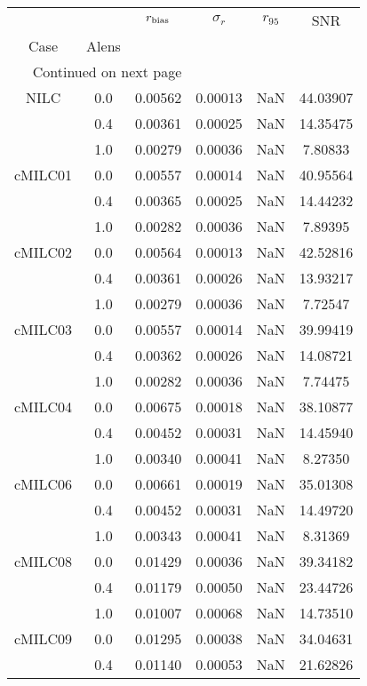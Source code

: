 \begin{longtable}{cccccc}
\toprule
     &     &  $r_{\rm bias}$  &  $\sigma_r$ &  $r_{95}$ &      SNR \\
Case & Alens &                  &             &           &          \\
\midrule
\endhead
\midrule
\multicolumn{3}{r}{{Continued on next page}} \\
\midrule
\endfoot

\bottomrule
\endlastfoot
NILC & 0.0 & 0.00562 & 0.00013 & NaN & 44.03907 \\
     & 0.4 & 0.00361 & 0.00025 & NaN & 14.35475 \\
     & 1.0 & 0.00279 & 0.00036 & NaN & 7.80833 \\
cMILC01 & 0.0 & 0.00557 & 0.00014 & NaN & 40.95564 \\
     & 0.4 & 0.00365 & 0.00025 & NaN & 14.44232 \\
     & 1.0 & 0.00282 & 0.00036 & NaN & 7.89395 \\
cMILC02 & 0.0 & 0.00564 & 0.00013 & NaN & 42.52816 \\
     & 0.4 & 0.00361 & 0.00026 & NaN & 13.93217 \\
     & 1.0 & 0.00279 & 0.00036 & NaN & 7.72547 \\
cMILC03 & 0.0 & 0.00557 & 0.00014 & NaN & 39.99419 \\
     & 0.4 & 0.00362 & 0.00026 & NaN & 14.08721 \\
     & 1.0 & 0.00282 & 0.00036 & NaN & 7.74475 \\
cMILC04 & 0.0 & 0.00675 & 0.00018 & NaN & 38.10877 \\
     & 0.4 & 0.00452 & 0.00031 & NaN & 14.45940 \\
     & 1.0 & 0.00340 & 0.00041 & NaN & 8.27350 \\
cMILC06 & 0.0 & 0.00661 & 0.00019 & NaN & 35.01308 \\
     & 0.4 & 0.00452 & 0.00031 & NaN & 14.49720 \\
     & 1.0 & 0.00343 & 0.00041 & NaN & 8.31369 \\
cMILC08 & 0.0 & 0.01429 & 0.00036 & NaN & 39.34182 \\
     & 0.4 & 0.01179 & 0.00050 & NaN & 23.44726 \\
     & 1.0 & 0.01007 & 0.00068 & NaN & 14.73510 \\
cMILC09 & 0.0 & 0.01295 & 0.00038 & NaN & 34.04631 \\
     & 0.4 & 0.01140 & 0.00053 & NaN & 21.62826 \\

\end{longtable}
